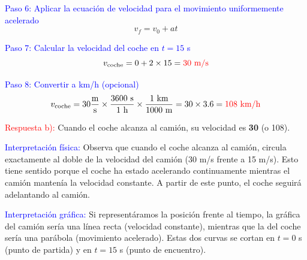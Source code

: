 \begin{exercise}
\begin{solu}
        \textcolor{blue}{Paso 6: Aplicar la ecuación de velocidad para el movimiento uniformemente acelerado}
        \[
            \boxed{v_f = v_0 + at}
        \]

        \textcolor{blue}{Paso 7: Calcular la velocidad del coche en $t = 15$ s}
        \[
            v_{\text{coche}} = 0 + 2 \times 15 = \textcolor{red}{30 \text{ m/s}}
        \]

        \textcolor{blue}{Paso 8: Convertir a km/h (opcional)}
        \[
            v_{\text{coche}} = 30 \frac{\text{m}}{\text{s}} \times \frac{3600 \text{ s}}{1 \text{ h}} \times \frac{1 \text{ km}}{1000 \text{ m}} = 30 \times 3.6 = \textcolor{red}{108 \text{ km/h}}
        \]

        \textcolor{red}{Respuesta b):} Cuando el coche alcanza al camión, su velocidad es \textbf{\qty{30}{\mps}} (o \qty{108}{\kmph}).

        \textcolor{blue}{Interpretación física:} Observa que cuando el coche alcanza al camión, circula exactamente al doble de la velocidad del camión (30 m/s frente a 15 m/s). Esto tiene sentido porque el coche ha estado acelerando continuamente mientras el camión mantenía la velocidad constante. A partir de este punto, el coche seguirá adelantando al camión.

        \vspace{0.3cm}

        \textcolor{blue}{Interpretación gráfica:} Si representáramos la posición frente al tiempo, la gráfica del camión sería una línea recta (velocidad constante), mientras que la del coche sería una parábola (movimiento acelerado). Estas dos curvas se cortan en $t = 0$ s (punto de partida) y en $t = 15$ s (punto de encuentro).
    \end{solu}
\end{exercise}

